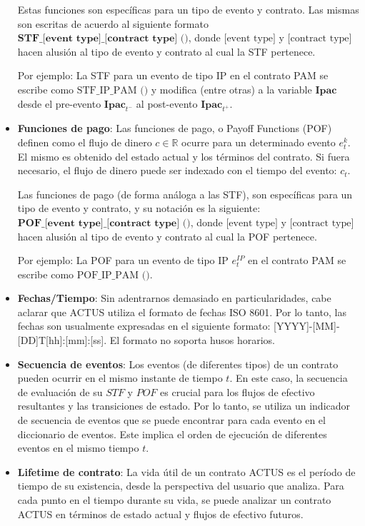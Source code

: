 \documentclass[12pt]{book}
\begin{document}
\begin{itemize}
	      Estas funciones son específicas para un tipo de evento y contrato. Las mismas son escritas de acuerdo al siguiente formato $\textbf{STF\_[event type]\_[contract type] ()}$, donde $\text{[event type]}$ y $\text{[contract type]}$ hacen alusión al tipo de evento y contrato al cual la STF pertenece.

	      Por ejemplo: La STF para un evento de tipo IP en el contrato PAM se escribe como $\text{STF\_IP\_PAM ()}$ y modifica (entre otras) a la variable $\textbf{Ipac}$ desde el pre-evento $\textbf{Ipac}_{t^-}$ al post-evento $\textbf{Ipac}_{t^+}$.

	\item \textbf{Funciones de pago}: Las funciones de pago, o Payoff Functions (POF) definen como el flujo de dinero $c \in\mathbb{R}$ ocurre para un determinado evento $e^k_t$. El mismo es obtenido del estado actual y los términos del contrato. Si fuera necesario, el flujo de dinero puede ser indexado con el tiempo del evento: $c_t$.

	      Las funciones de pago (de forma análoga a las STF), son específicas para un tipo de evento y contrato, y su notación es la siguiente: $\textbf{POF\_[event type]\_[contract type] ()}$, donde $\text{[event type]}$ y $\text{[contract type]}$ hacen alusión al tipo de evento y contrato al cual la POF pertenece.

	      Por ejemplo: La POF para un evento de tipo IP $e^{IP}_t$ en el contrato PAM se escribe como $\text{POF\_IP\_PAM ()}$.

	\item \textbf{Fechas/Tiempo}: Sin adentrarnos demasiado en particularidades, cabe aclarar que ACTUS utiliza el formato de fechas ISO 8601. Por lo tanto, las fechas son usualmente expresadas en el siguiente formato: [YYYY]-[MM]-[DD]T[hh]:[mm]:[ss]. El formato no soporta husos horarios.

	\item \textbf{Secuencia de eventos}: Los eventos (de diferentes tipos) de un contrato pueden ocurrir en el mismo instante de tiempo $t$. En este caso, la secuencia de evaluación de su $STF$ y $POF$ es crucial para los flujos de efectivo resultantes y las transiciones de estado. Por lo tanto, se utiliza un indicador de secuencia de eventos que se puede encontrar para cada evento en el diccionario de eventos. Este implica el orden de ejecución de  diferentes eventos en el mismo tiempo $t$.

	\item \textbf{Lifetime de contrato}: La vida útil de un contrato ACTUS es el período de tiempo de su existencia, desde la perspectiva del usuario que analiza. Para cada punto en el tiempo durante su vida, se puede analizar un contrato ACTUS en términos de estado actual y flujos de efectivo futuros.

\end{itemize}
\end{document}
